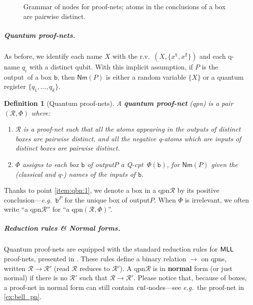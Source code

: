 \documentclass[10pt,a4paper]{article}
\newcommand*{\eg}{\emph{e.g.}\xspace}
\newcommand*{\definitive}[1]{\textbf{#1}}
\newcommand{\true}{\mathtt{t}}
\newcommand{\false}{\mathtt{f}}
\newcommand{\MLL}{\ensuremath{\mathsf{MLL}}\xspace}
\newcommand*{\posatom}[1]{{#1}^+}
\newcommand*{\negatom}[1]{{#1}^-}
\newcommand*{\rulenametext}[1]{\textnormal{\textit{#1}}}
\newcommand*{\cut}{\rulenametext{cut}}
\newcommand{\Nm}[1]{\mathsf{Nm}(#1)}
\newcommand*{\boxof}[1]{\ensuremath{\bbox^{#1}}}
\newcommand*{\logsys}[1]{\textnormal{\textsf{#1}}}
\renewcommand*{\MLL}{\ensuremath{\logsys{MLL}}\xspace}
\newcommand*{\somepn}{\mathcal{R}}
\newcommand{\bbox}{\mathtt{b}}
\newcommand{\Red}[1][]{\xrightarrow{#1}}
\newcommand{\reg}{Q}
\newcommand{\qreg}{\reg}
\newcommand*{\someqfactset}{\Phi}
\newcommand*{\cw}[1][]{\mathrm{w}_{#1}}
\newcommand{\rv}{r.v.\xspace}
\newcommand*{\qCPT}{Q-\textsf{cpt}\xspace}
\newcommand*{\qpn}{quantum proof-net\xspace}
\newcommand*{\Qpns}{Quantum proof-nets\xspace}
\newcommand*{\qbpn}{\textsf{qpn}\xspace}
\newcommand*{\qbpns}{\textsf{qpns}\xspace}
\newcommand*{\main}{output\xspace}
\newcommand{\pn}{proof-net\xspace}
\newcommand{\pns}{proof-nets\xspace}
\newtheorem{definition}[theorem]{Definition}
\begin{document}
\begin{figure}
\begin{adjustbox}{}
\end{adjustbox}
\caption{
	Grammar of nodes for proof-nets;
	atoms in the conclusions of a box are pairwise distinct.
}
\label{fig:grammar_nodes_pn}\label{fig:pn}
\end{figure}

\subparagraph{Quantum \pns.}

As before, we identify each name $X$ with the \rv\ $(X, \{x^{\true}, x^{\false}\})$ and each q-name $q_i$ with a distinct qubit.
With this implicit assumption, if $P$ is the \main\ of a box $\bbox$, then $\Nm P$ is either a random variable $\{X\}$ or a quantum register $\{q_1, \dots, q_k\}$.

\begin{definition}[Quantum \pns]\label{def:qbn}
A \definitive{\qpn} (\qbpn) is a pair $(\somepn, \Phi)$ where:
\begin{enumerate}
\item\label{item:qbn:1}
$\somepn$ is a proof-net such that all the atoms appearing in the outputs of distinct boxes are pairwise distinct, and all the negative q-atoms which are inputs of distinct boxes are pairwise distinct.
\item
$\someqfactset$ assigns to each box $\bbox$ of \main $P$ a \qCPT\ $\someqfactset(\bbox)$, for $\Nm{P}$ given the (classical and q-) names of the inputs of $\bbox$.
\end{enumerate}
\end{definition}

Thanks to point \ref{item:qbn:1}, we denote a box in a \qbpn $\somepn$ by its positive conclusion---\eg\ $\boxof{P}$ for the unique box of \main $P$. When $\Phi$ is irrelevant, we often write ``a \qbpn $\somepn$'' for ``a \qbpn $(\somepn,\Phi)$''.

\subparagraph{Reduction rules \& Normal forms.}

\Qpns are equipped with the standard reduction rules for \MLL proof-nets, presented in .
These rules define a binary relation $\Red$ on \qbpns, written $\somepn \Red \somepn'$ (read $\somepn$ reduces to $\somepn'$).
A \qbpn $\somepn$ is in \definitive{normal} form (or just normal) if there is no $\somepn'$ such that $\somepn \Red \somepn'$. 
Please notice that, because of boxes, a proof-net in normal form can still contain $\cut$-nodes---see \eg\ the \pn in \cref{ex:bell_pn}.
\end{document}
